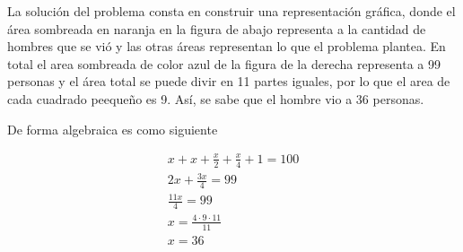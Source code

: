 La solución del problema consta en construir una representación gráfica, donde el área sombreada en naranja en la figura de abajo representa a la cantidad de hombres que se vió y las otras áreas representan lo que el problema plantea. En total el area sombreada de color azul de la figura de la derecha representa a 99 personas y el área total se puede divir en 11 partes iguales, por lo que el area de cada cuadrado peequeño es 9. Así, se sabe que el hombre vio a 36 personas.

\par
\begin{minipage}[t]{0.48\textwidth}
    
\end{minipage}
\begin{minipage}[t]{0.48\textwidth}
    
\end{minipage}
\par

De forma algebraica es como siguiente

\begin{gather*}
    x+x+\frac{x}{2}+\frac{x}{4}+1=100 \\
    2x+\frac{3x}{4} = 99 \\
    \frac{11x}{4} = 99 \\
    x = \frac{4\cdot9\cdot11}{11} \\
    x = 36
\end{gather*}